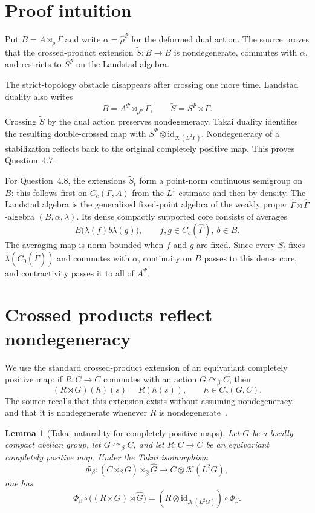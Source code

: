 \documentclass[11pt]{article}
\newtheorem{lemma}[theorem]{Lemma}
\theoremstyle{remark}
\newcommand{\id}{\mathrm{id}}
\newcommand{\K}{\mathcal K}
\begin{document}
\section{Proof intuition}

Put $B=A\rtimes_\rho\Gamma$ and write
$\alpha=\widehat\rho^\Psi$ for the deformed dual action. The source proves
that the crossed-product extension $\widetilde S:B\to B$ is nondegenerate,
commutes with $\alpha$, and restricts to $S^\Psi$ on the Landstad algebra.

The strict-topology obstacle disappears after crossing one more time.
Landstad duality also writes
\[
 B=A^\Psi\rtimes_{\rho^\Psi}\Gamma,
 \qquad
 \widetilde S=S^\Psi\rtimes\Gamma .
\]
Crossing $\widetilde S$ by the dual action preserves nondegeneracy. Takai
duality identifies the resulting double-crossed map with
$S^\Psi\otimes\id_{\K(L^2\Gamma)}$. Nondegeneracy of a stabilization reflects
back to the original completely positive map. This proves Question~4.7.

For Question~4.8, the extensions $\widetilde S_t$ form a point-norm
continuous semigroup on $B$: this follows first on $C_c(\Gamma,A)$ from the
$L^1$ estimate and then by density. The Landstad algebra is the generalized
fixed-point algebra of the weakly proper
$\widehat\Gamma\rtimes\widehat\Gamma$-algebra
$(B,\alpha,\lambda)$. Its dense compactly supported core consists of
averages
\[
 E\bigl(\lambda(f)b\lambda(g)\bigr),
 \qquad f,g\in C_c(\widehat\Gamma),\ b\in B.
\]
The averaging map is norm bounded when $f$ and $g$ are fixed. Since every
$\widetilde S_t$ fixes $\lambda(C_0(\widehat\Gamma))$ and commutes with
$\alpha$, continuity on $B$ passes to this dense core, and contractivity
passes it to all of $A^\Psi$.

\section{Crossed products reflect nondegeneracy}

We use the standard crossed-product extension of an equivariant completely
positive map: if $R:C\to C$ commutes with an action
$G\curvearrowright_\beta C$, then
\[
 (R\rtimes G)(h)(s)=R(h(s)),
 \qquad h\in C_c(G,C).
\]
The source recalls that this extension exists without assuming
nondegeneracy, and that it is nondegenerate whenever $R$ is
nondegenerate~\cite[Proposition~4.5 and Remark~4.6]{SkalskiViselter}.

\begin{lemma}[Takai naturality for completely positive maps]
\label{lem:takai}
Let $G$ be a locally compact abelian group, let
$G\curvearrowright_\beta C$, and let $R:C\to C$ be an equivariant completely
positive map. Under the Takai isomorphism
\[
 \Phi_\beta:
 (C\rtimes_\beta G)\rtimes_{\widehat\beta}\widehat G
 \longrightarrow C\otimes\K(L^2G),
\]
one has
\[
 \Phi_\beta\circ\bigl((R\rtimes G)\rtimes\widehat G\bigr)
 =(R\otimes\id_{\K(L^2G)})\circ\Phi_\beta .
\]
\end{lemma}
\end{document}
